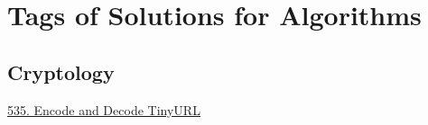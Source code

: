 \section*{Tags of Solutions for Algorithms}
\label{sec:algo_tag}

\subsection*{Cryptology}
\hyperref[algo:535]{535. Encode and Decode TinyURL}
